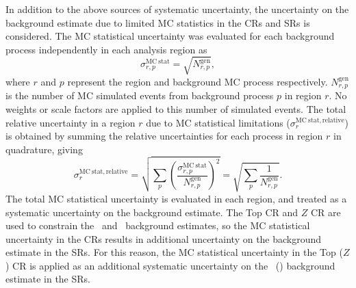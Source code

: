 In addition to the above sources of systematic uncertainty, the uncertainty
on the background estimate due to limited MC statistics in the CRs and SRs is
considered.
The MC statistical uncertainty was evaluated for each background process
independently in each analysis region as
\begin{equation}
  \sigma_{r,p}^\mathrm{MC~stat}
  =
  \sqrt{N_{r,p}^\mathrm{gen}},
\end{equation}
where $r$ and $p$ represent the region and background MC process respectively.
$N_{r,p}^\mathrm{gen}$ is the number of MC simulated events from background
process $p$ in region $r$.
No weights or scale factors are applied to this number of simulated events.
The total relative uncertainty in a region $r$ due to MC statistical
limitations ($\sigma_{r}^\mathrm{MC~stat,relative}$) is obtained by summing the
relative uncertainties for each process in region $r$ in quadrature, giving
\begin{equation}
  \sigma_{r}^\mathrm{MC~stat,relative}
  =
  \sqrt{ \sum_{p} \left(\frac{\sigma_{r,p}^\mathrm{MC~stat}}{N_{r,p}^\mathrm{gen}}\right)^2 }
  =
  \sqrt{ \sum_{p} \frac{1}{N_{r,p}^\mathrm{gen}} }.
\end{equation}
The total MC statistical uncertainty is evaluated in each region, and treated
as a systematic uncertainty on the background estimate.
The Top CR and $Z$ CR are used to constrain the \TTBAR\ and
\ZGAMMAJETS\ background estimates, so the MC statistical uncertainty in the
CRs results in additional uncertainty on the background estimate in the SRs.
For this reason, the MC statistical uncertainty in the Top ($Z$) CR is applied
as an additional systematic uncertainty on the \TTBAR\ (\ZGAMMAJETS) background
estimate in the SRs.

